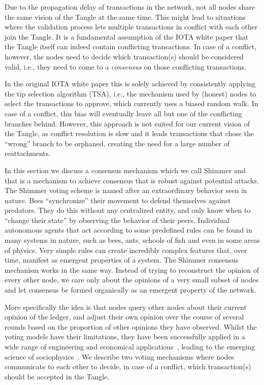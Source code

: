 \documentclass[../main.tex]{subfiles}
\begin{document}
Due to the propagation delay of transactions in the network, not all nodes share the same vision of the Tangle at the same time.
This might lead to situations where the validation process lets multiple transactions in conflict with each other join the Tangle.
It is a fundamental assumption of the IOTA white paper that the Tangle itself can indeed contain conflicting transactions.
In case of a conflict, however, the nodes need to decide which transaction(s) should be considered valid, i.e., they need to come to a \emph{consensus} on those conflicting transactions.

In the original IOTA white paper this is solely achieved by consistently applying the tip selection algorithm (TSA), i.e., the mechanism used by (honest) nodes to select the transactions to approve, which currently uses a biased random walk. In case of a conflict, this bias will eventually leave all but one of the conflicting branches behind. However, this approach is not suited for our current vision of the Tangle, as conflict resolution is slow and it leads transactions that chose the ``wrong'' branch to be orphaned, creating the need for a large number of reattachments.


In this section we discuss a consensus mechanism  which we call Shimmer and that is a mechanism to achieve consensus that is robust against potential attacks. The Shimmer voting scheme is named after an extraordinary behavior seen in nature. Bees “synchronize” their movement to defend themselves against predators. They do this without any centralized entity, and only know when to “change their state” by observing the behavior of their peers. Individual autonomous agents that act according to some predefined rules can be found in many systems in nature, such as bees, ants, schools of fish and even in some areas of physics. Very simple rules can create incredibly complex features that, over time, manifest as emergent properties of a system. The Shimmer consensus mechanism works in the same way. Instead of trying to reconstruct the opinion of every other node, we care only about the opinions of a very small subset of nodes and let consensus be formed organically as an emergent property of the network.


More specifically the idea is that nodes query other nodes about their current opinion of the ledger, and adjust their own opinion over the course of several rounds based on the proportion of other opinions they have observed. Whilst the voting models have their limitations, they have been successfully applied in a wide range of engineering and economical applications~\cite{banisch2010, niu2015, przyby2011}, leading to the emerging science of sociophysics~\cite{castellano2009}. We describe two voting mechanisms where nodes communicate to each other to decide, in case of a conflict, which transaction(s) should be accepted in the Tangle.
\end{document}
